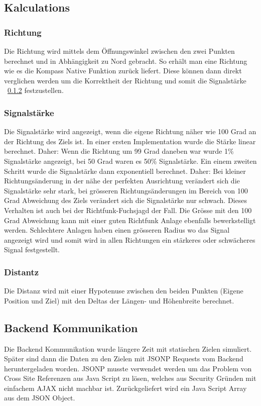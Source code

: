 \subsection{Kalculations} %
\label{sub:kalculations}
\subsubsection{Richtung} %
\label{ssub:richtung}
Die Richtung wird mittels dem Öffnungswinkel zwischen den zwei Punkten berechnet und in Abhängigkeit zu Nord gebracht. So erhält man eine Richtung wie es die Kompass Native Funktion zurück liefert. Diese können dann direkt verglichen werden um die Korrektheit der Richtung und somit die Signalstärke ~\ref{ssub:signalstärke}
 festzustellen. 
\subsubsection{Signalstärke} %
\label{ssub:signalstärke}
Die Signalstärke wird angezeigt, wenn die eigene Richtung näher wie 100 Grad an der Richtung des Ziels ist. In einer ersten Implementation wurde die Stärke linear berechnet. Daher: Wenn die Richtung um 99 Grad daneben war wurde 1\% Signalstärke angezeigt, bei 50 Grad waren es 50\% Signalstärke. Ein einem zweiten Schritt wurde die Signalstärke dann exponentiell berechnet. Daher: Bei kleiner Richtungsänderung in der nähe der perfekten Ausrichtung verändert sich die Signalstärke sehr stark, bei grösseren Richtungsänderungen im Bereich von 100 Grad Abweichung des Ziels verändert sich die Signalstärke nur schwach. Dieses Verhalten ist auch bei der Richtfunk-Fuchsjagd der Fall. Die Grösse mit den 100 Grad Abweichung kann mit einer guten Richtfunk Anlage ebenfalls bewerkstelligt werden. Schlechtere Anlagen haben einen grösseren Radius wo das Signal angezeigt wird und somit wird in allen Richtungen ein stärkeres oder schwächeres Signal festgestellt.
\subsubsection{Distantz} %
\label{ssub:distantz}
Die Distanz wird mit einer Hypotenuse zwischen den beiden Punkten (Eigene Position und Ziel) mit den Deltas der Längen- und Höhenbreite berechnet. 

\subsection{Backend Kommunikation} %
\label{sub:backend_kommunikation}
Die Backend Kommunikation wurde längere Zeit mit statischen Zielen simuliert. Später sind dann die Daten zu den Zielen mit JSONP Requests vom Backend heruntergeladen worden. JSONP musste verwendet werden um das Problem von Cross Site Referenzen aus Java Script zu lösen, welches aus Security Gründen mit einfachem AJAX nicht machbar ist. Zurückgeliefert wird ein Java Script Array aus dem JSON Object.

